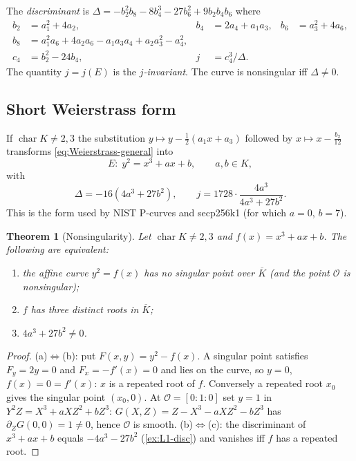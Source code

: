 \documentclass[11pt,a4paper,oneside]{book}
\theoremstyle{plain}
\newtheorem{theorem}{Theorem}[chapter]
\theoremstyle{definition}
\theoremstyle{remark}
\newcommand{\Oinf}{\mathcal{O}}
\newcommand{\Kbar}{\overline{K}}
\begin{document}
The \emph{discriminant} is $\Delta=-b_2^2b_8-8b_4^3-27b_6^2+9b_2b_4b_6$ where
\begin{align*}
b_2&=a_1^2+4a_2, & b_4&=2a_4+a_1a_3, & b_6&=a_3^2+4a_6,\\
b_8&=a_1^2a_6+4a_2a_6-a_1a_3a_4+a_2a_3^2-a_4^2,\\
c_4&=b_2^2-24b_4, & j&=c_4^3/\Delta.
\end{align*}
The quantity $j=j(E)$ is the \emph{$j$-invariant}. The curve is nonsingular iff $\Delta\ne0$.

\subsection{Short Weierstrass form}

If $\operatorname{char}K\ne2,3$ the substitution $y\mapsto y-\tfrac12(a_1x+a_3)$ followed by $x\mapsto x-\tfrac{b_2}{12}$ transforms \eqref{eq:Weierstrass-general} into
\begin{equation}\label{eq:short}
E:\; y^2=x^3+ax+b,\qquad a,b\in K,
\end{equation}
with
\begin{equation}\label{eq:disc-j}
\Delta=-16(4a^3+27b^2),\qquad j=1728\cdot\frac{4a^3}{4a^3+27b^2}.
\end{equation}
This is the form used by NIST P-curves and secp256k1 (for which $a=0$, $b=7$).

\begin{theorem}[Nonsingularity]\label{thm:nonsingular}
Let $\operatorname{char}K\neq2,3$ and $f(x)=x^3+ax+b$. The following are equivalent:
\begin{enumerate}[nosep,label=(\alph*)]
\item the affine curve $y^2=f(x)$ has no singular point over $\Kbar$ (and the point $\Oinf$ is nonsingular);
\item $f$ has three distinct roots in $\Kbar$;
\item $4a^3+27b^2\ne0$.
\end{enumerate}
\end{theorem}
\begin{proof}
(a)$\Leftrightarrow$(b): put $F(x,y)=y^2-f(x)$. A singular point satisfies $F_y=2y=0$ and $F_x=-f'(x)=0$ and lies on the curve, so $y=0$, $f(x)=0=f'(x)$: $x$ is a repeated root of $f$. Conversely a repeated root $x_0$ gives the singular point $(x_0,0)$. At $\Oinf=[0:1:0]$ set $y=1$ in $Y^2Z=X^3+aXZ^2+bZ^3$: $G(X,Z)=Z-X^3-aXZ^2-bZ^3$ has $\partial_ZG(0,0)=1\ne0$, hence $\Oinf$ is smooth.
(b)$\Leftrightarrow$(c): the discriminant of $x^3+ax+b$ equals $-4a^3-27b^2$ (\cref{ex:L1-disc}) and vanishes iff $f$ has a repeated root.
\end{proof}
\end{document}
